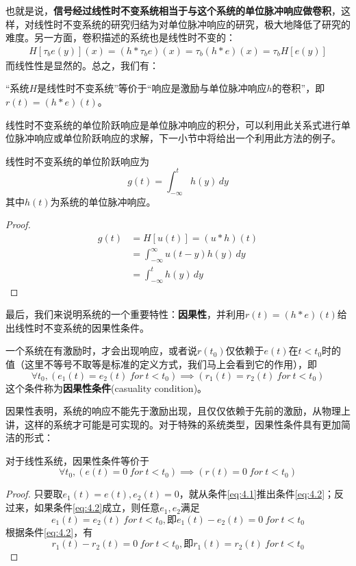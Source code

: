 \documentclass{ctexbook}
\begin{document}
也就是说，\textbf{信号经过线性时不变系统相当于与这个系统的单位脉冲响应做卷积}，这样，对线性时不变系统的研究归结为对单位脉冲响应的研究，极大地降低了研究的难度。另一方面，卷积描述的系统也是线性时不变的：\begin{align*}
    H[\tau_b e(y)](x)=(h*\tau_b e)(x)=\tau_b(h*e)(x)=\tau_b H[e(y)]
\end{align*}
而线性性是显然的。总之，我们有：
\begin{proposition}[线性时不变系统的等价定义]
    “系统$H$是线性时不变系统”等价于“响应是激励与单位脉冲响应$h$的卷积”，即$r(t)=(h*e)(t)$。
\end{proposition}

线性时不变系统的单位阶跃响应是单位脉冲响应的积分，可以利用此关系式进行单位脉冲响应或单位阶跃响应的求解，下一小节中将给出一个利用此方法的例子。

\begin{proposition}[单位阶跃响应]
线性时不变系统的单位阶跃响应为
$$g(t)=\int_{-\infty}^{t}h(y)\,dy$$
其中$h(t)$为系统的单位脉冲响应。
\end{proposition}
\begin{proof}
\begin{align*}
    g(t)&=H[u(t)]=(u*h)(t)\\
    &=\int_{-\infty}^{\infty}u(t-y)h(y)\,dy\\
    &=\int_{-\infty}^{t}h(y)\,dy
\end{align*}
\end{proof}

最后，我们来说明系统的一个重要特性：\textbf{因果性}，并利用$r(t)=(h*e)(t)$给出线性时不变系统的因果性条件。

\begin{definition}[因果性]
一个系统在有激励时，才会出现响应，或者说$r(t_0)$仅依赖于$e(t)$在$t<t_0$时的值（这里不等号不取等是标准的定义方式，我们马上会看到它的作用），即
\begin{equation}
    \forall t_0,\left(e_1(t)=e_2(t)\ for\ t<t_0\right)\implies \left(r_1(t)=r_2(t)\ for\ t<t_0\right)\label{eq:4.1}
\end{equation}
这个条件称为\textbf{因果性条件}(casuality condition)。
\end{definition}

因果性表明，系统的响应不能先于激励出现，且仅仅依赖于先前的激励，从物理上讲，这样的系统才可能是可实现的。对于特殊的系统类型，因果性条件具有更加简洁的形式：

\begin{proposition}
对于线性系统，因果性条件等价于
\begin{equation}
    \forall t_0,\left(e(t)=0\ for\ t<t_0\right)\implies \left(r(t)=0\ for\ t<t_0\right)\label{eq:4.2}
\end{equation}
\end{proposition}
\begin{proof}
只要取$e_1(t)=e(t),e_2(t)=0$，就从条件\ref{eq:4.1}推出条件\ref{eq:4.2}；反过来，如果条件\ref{eq:4.2}成立，则任意$e_1,e_2$满足
$$e_1(t)=e_2(t)\ for\ t<t_0,\text{即}e_1(t)-e_2(t)=0\ for\ t<t_0$$
根据条件\ref{eq:4.2}，有
$$r_1(t)-r_2(t)=0\ for\ t<t_0,\text{即}r_1(t)=r_2(t)\ for\ t<t_0$$
\end{proof}
\end{document}
